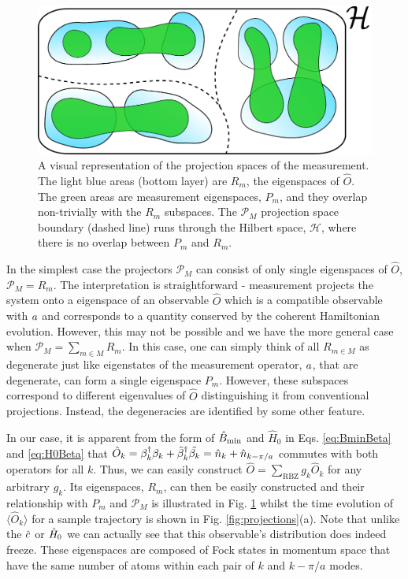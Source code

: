 \begin{figure}[hbtp!]
	\includegraphics[width=\linewidth]{spaces}
	\caption[A Visual Representation of the Projection Spaces of
        the Measurement]{A visual representation of the projection
          spaces of the measurement. The light blue areas (bottom
          layer) are $R_m$, the eigenspaces of $\hat{O}$. The green
          areas are measurement eigenspaces, $P_m$, and they overlap
          non-trivially with the $R_m$ subspaces. The $\mathcal{P}_M$
          projection space boundary (dashed line) runs through the
          Hilbert space, $\mathcal{H}$, where there is no overlap
          between $P_m$ and $R_m$.  \label{fig:spaces}}
\end{figure}

In the simplest case the projectors $\mathcal{P}_M$ can consist of
only single eigenspaces of $\hat{O}$, $\mathcal{P}_M = R_m$. The
interpretation is straightforward - measurement projects the system
onto a eigenspace of an observable $\hat{O}$ which is a compatible
observable with $a$ and corresponds to a quantity conserved by the
coherent Hamiltonian evolution. However, this may not be possible and
we have the more general case when
$\mathcal{P}_M = \sum_{m \in M} R_m$. In this case, one can simply
think of all $R_{m \in M}$ as degenerate just like eigenstates of the
measurement operator, $a$, that are degenerate, can form a single
eigenspace $P_m$. However, these subspaces correspond to different
eigenvalues of $\hat{O}$ distinguishing it from conventional
projections. Instead, the degeneracies are identified by some other
feature.

In our case, it is apparent from the form of $\hat{B}_\mathrm{min}$ and $\hat{H}_0$
in Eqs. \eqref{eq:BminBeta} and \eqref{eq:H0Beta} that
$\hat{O}_k = \beta_k^\dagger \beta_k + \tilde{\beta}_k^\dagger
\tilde{\beta_k} = \hat{n}_k + \hat{n}_{k - \pi/a}$ commutes with both operators
for all $k$. Thus, we can easily construct
$\hat{O} = \sum_\mathrm{RBZ} g_k \hat{O}_k$ for any arbitrary
$g_k$. Its eigenspaces, $R_m$, can then be easily constructed and
their relationship with $P_m$ and $\mathcal{P}_M$ is illustrated in
Fig. \ref{fig:spaces} whilst the time evolution of
$\langle \hat{O}_k \rangle$ for a sample trajectory is shown in
Fig. \ref{fig:projections}(a). Note that unlike the $\hat{c}$ or $\hat{H}_0$ we
can actually see that this observable's distribution does indeed
freeze. These eigenspaces are composed of Fock states in momentum
space that have the same number of atoms within each pair of $k$ and
$k - \pi/a$ modes.

